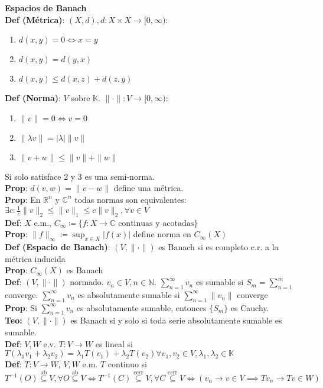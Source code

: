 \documentclass[9pt]{extarticle}
\newcommand{\N}{\mathbb{N}}
\newcommand{\C}{\mathbb{C}}
\newcommand{\R}{\mathbb{R}}
\newcommand{\K}{\mathbb{K}}
\begin{document}
\begin{multicols*}{2}

\large\textbf{Espacios de Banach}\\\normalsize
\textbf{Def (Métrica)}: $(X,d), d:X\times X\to [0,\infty)$:
\begin{enumerate}
	\item $d(x,y)=0 \Leftrightarrow x=y$
	\item $d(x,y)=d(y,x)$
	\item $d(x,y)\leq d(x,z)+d(z,y)$
\end{enumerate}
\textbf{Def (Norma)}: $V$ sobre $\K$. $\|\cdot\|:V\to [0,\infty)$:
\begin{enumerate}
	\item $\|v\|=0 \Leftrightarrow v=0$
	\item $\|\lambda v\|=|\lambda|\|v\|$
	\item $\|v+w\|\leq \|v\|+\|w\|$
\end{enumerate}
Si solo satisface 2 y 3 es una semi-norma.\\
\textbf{Prop}: $d(v,w)=\|v-w\|$ define una métrica.\\
\textbf{Prop}: En $\R^n$ y $\C^n$ todas normas son equivalentes: $\exists c:\frac{1}{c}\|v\|_2\leq \|v\|_1\leq c\|v\|_2,\forall v\in V$\\
\textbf{Def}: $X$ e.m., $C_\infty\coloneqq\{f:X\to\C\text{ continuas y acotadas}\}$\\
\textbf{Prop}: $\|f\|_\infty\coloneqq \sup_{x\in X}|f(x)|$ define norma en $C_\infty(X)$\\
\textbf{Def (Espacio de Banach)}: $(V,\|\cdot\|)$ es Banach si es completo c.r. a la métrica inducida\\
\textbf{Prop}: $C_\infty(X)$ es Banach\\
\textbf{Def}: $(V,\|\cdot\|)$ normado. $v_n\in V,n\in\N$. $\sum_{n=1}^\infty v_n$ es sumable si $S_m=\sum_{n=1}^m$ converge. $\sum_{n=1}^\infty v_n$ es absolutamente sumable si $\sum_{n=1}^\infty \|v_n\|$ converge\\
\textbf{Prop}: Si $\sum_{n=1}^\infty v_n$ es absolutamente sumable, entonces $\{S_m\}$ es Cauchy.\\
\textbf{Teo:} $(V,\|\cdot\|)$ es Banach si y solo si toda serie absolutamente sumable es sumable.\\
\textbf{Def}: $V,W$ e.v. $T:V\to W$ es lineal si $T(\lambda_1v_1+\lambda_2v_2)=\lambda_1T(v_1)+\lambda_2T(v_2)\forall v_1,v_2\in V,\lambda_1,\lambda_2\in\K$\\
\textbf{Def}: $T:V\to W$, $V,W$ e.m. $T$ continuo si $T^{-1}(O)\overset{\text{ab}}{\subseteq} V,\forall O\overset{\text{ab}}{\subseteq} V\iff T^{-1}(C)\overset{\text{cerr}}{\subseteq} V,\forall C\overset{\text{cerr}}{\subseteq} V\iff (v_n\to v\in V\implies Tv_n\to Tv\in W)$\\

\end{multicols*}
\end{document}
